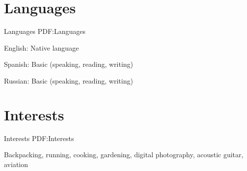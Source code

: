 \documentclass[letterpaper,MMMyyyy,nonstop]{simpleresumecv}
\begin{document}
\begin{body}

\section
{Languages}
{Languages}
{PDF:Languages}

\BulletItem
English: Native language

\GapNoBreak
\BulletItem
Spanish: Basic (speaking, reading, writing)

\GapNoBreak
\BulletItem
Russian: Basic (speaking, reading, writing)


\section
{Interests}
{Interests}
{PDF:Interests}

Backpacking,
running,
cooking,
gardening,
digital photography,
acoustic guitar,
aviation







\end{body}
\end{document}
